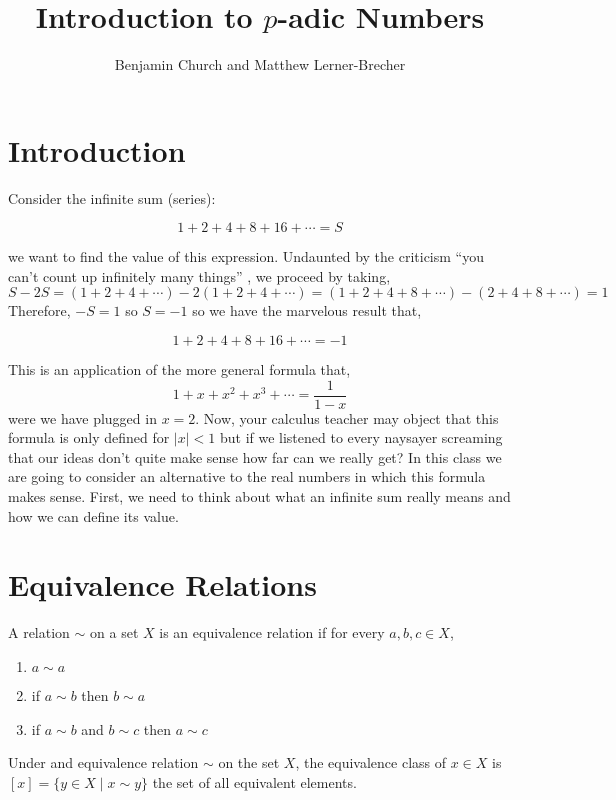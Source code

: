 \documentclass{article}
\newenvironment{definition}[1][Definition:]{\begin{trivlist}
\item[\hskip \labelsep {\bfseries #1}]}{\end{trivlist}}
\theoremstyle{theorem}
\theoremstyle{definition}
\theoremstyle{definition}
\theoremstyle{remark}
\theoremstyle{definition}
\theoremstyle{remark}
\begin{document}
\author{Benjamin Church and Matthew Lerner-Brecher}
\title{\Huge Introduction to $p$-adic Numbers}

\maketitle
\tableofcontents
\newpage


\section{Introduction}
Consider the infinite sum (series):

\[1 + 2 + 4 + 8 + 16 + \cdots = S\]

we want to find the value of this expression. Undaunted by the criticism ``you can't count up infinitely many things'' , we proceed by taking, 
\[S - 2S = (1 + 2 + 4 + \cdots) - 2 (1 + 2 + 4 + \cdots) = (1 + 2 + 4 + 8 + \cdots) - (2 + 4 + 8 + \cdots) = 1\]
Therefore, $-S = 1$ so $S = -1$ so we have the marvelous result that,

\[1 + 2 + 4 + 8 + 16 + \cdots = -1\] 

This is an application of the more general formula that,
\[ 1 + x + x^2 + x^3 + \cdots = \frac{1}{1 - x}\]
were we have plugged in $x = 2$. Now, your calculus teacher may object that this formula is only defined for $|x| < 1$ but if we listened to every naysayer screaming that our ideas don't quite make sense how far can we really get? In this class we are going to consider an alternative to the real numbers in which this formula makes sense. First, we need to think about what an infinite sum really means and how we can define its value. 

\section{Equivalence Relations}

\begin{definition}
A relation $\sim$ on a set $X$ is an equivalence relation if for every $a,b,c \in X$,
\begin{enumerate}
\item $a \sim a$
\item if $a \sim b$ then $b \sim a$
\item if $a \sim b$ and $b \sim c$ then $a \sim c$
\end{enumerate}
\end{definition}

\begin{definition}
Under and equivalence relation $\sim$ on the set $X$, the equivalence class of $x \in X$ is $[x] = \{y \in X \mid x \sim y\}$ the set of all equivalent elements.
\end{definition}
\end{document}
